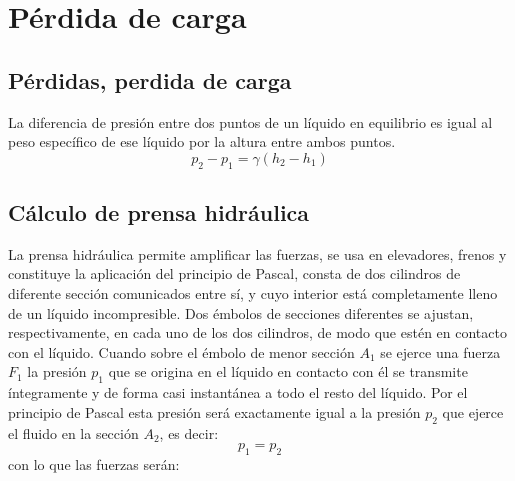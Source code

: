 \documentclass[../main]{subfiles}
\begin{document}
\chapter{Pérdida de carga}
\section{Pérdidas, perdida de carga} \label{sec:tp1}

   
La diferencia de presión entre dos puntos de un líquido en equilibrio es igual al peso específico de ese líquido por la altura entre ambos puntos.
\begin{equation}
    p_2-p_1=\gamma (h_2-h_1)
\end{equation}

\begin{center}
\end{center}


\section{Cálculo de prensa hidráulica}
La prensa hidráulica permite amplificar las fuerzas, se usa en elevadores, frenos y constituye la aplicación del principio de Pascal, consta de dos cilindros de diferente sección comunicados entre sí, y cuyo interior está completamente lleno de un líquido incompresible. Dos émbolos de secciones diferentes se ajustan, respectivamente, en cada uno de los dos cilindros, de modo que estén en contacto con el líquido. Cuando sobre el émbolo de menor sección $A_1$ se ejerce una fuerza $F_1$ la presión $p_1$ que se origina en el líquido en contacto con él se transmite íntegramente y de forma casi instantánea a todo el resto del líquido. Por el principio de Pascal esta presión será exactamente igual a la presión $p_2$ que ejerce el fluido en la sección $A_2$, es decir:
\begin{equation}
p_{1}=p_{2}
\end{equation}
con lo que las fuerzas serán:
\end{document}
